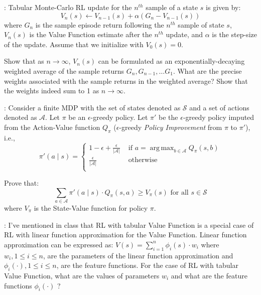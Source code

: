 \documentclass[12pt]{exam}
\DeclareMathOperator*{\argmax}{arg\,max}
\begin{document}
\begin{questions}

: Tabular Monte-Carlo RL update for the $n^{th}$ sample of a state $s$ is given by:
$$V_n(s) \leftarrow V_{n-1}(s) + \alpha(G_n - V_{n-1}(s))$$
where $G_n$ is the sample episode return following the $n^{th}$ sample of state $s$, $V_n(s)$ is the Value Function estimate after the $n^{th}$ update, and $\alpha$ is the step-size of the update. Assume that we initialize with $V_0(s) = 0$.

Show that as $n\rightarrow \infty$, $V_n(s)$ can be formulated as an exponentially-decaying weighted average of the sample returns $G_n, G_{n-1}, \ldots G_1$. What are the precise weights associated with the sample returns in the weighted average? Show that the weights indeed sum to 1 as $n\rightarrow \infty$.
\pagebreak

: Consider a finite MDP with the set of states denoted as $\mathcal{S}$ and a set of actions denoted as $\mathcal{A}$. Let $\pi$ be an $\epsilon$-greedy policy. Let $\pi'$ be the $\epsilon$-greedy policy imputed from the Action-Value function $Q_{\pi}$ ($\epsilon$-greedy {\em Policy Improvement} from $\pi$ to $\pi'$), i.e.,
$$
\pi'(a \mid s) =
\begin{cases}
1 - \epsilon + \frac \epsilon {|\mathcal{A}|} & \text{ if } a = \argmax_{b \in \mathcal{A}} Q_{\pi}(s, b)\\
\frac \epsilon {|\mathcal{A}|} & \text{ otherwise}\\
\end{cases}
$$

Prove that:
$$\sum_{a \in \mathcal{A}} \pi'(a \mid s) \cdot Q_{\pi}(s,a) \geq V_{\pi}(s) \mbox{ for all } s \in \mathcal{S}$$
where $V_{\pi}$ is the State-Value function for policy $\pi$.
\vspace{10mm}

: I've mentioned in class that RL with tabular Value Function is a special case of RL with linear function approximation for the Value Function. Linear function approximation can be expressed as: $V(s) = \sum_{i=1}^n \phi_i(s) \cdot w_i$ where $w_i, 1\leq i \leq n$, are the parameters of the linear function approximation and $\phi_i(\cdot), 1 \leq i \leq n$, are the feature functions. For the case of RL with tabular Value Function, what are the values of parameters $w_i$ and what are the feature functions $\phi_i(\cdot)$ ?
\vspace{10mm}


\end{questions}
\end{document}
